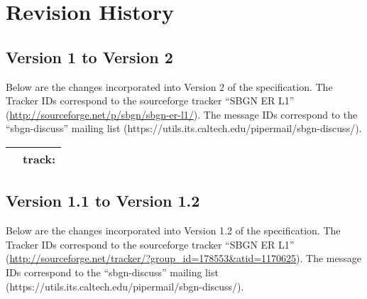 \chapter{Revision History}

\section{Version 1 to Version 2}

Below are the changes incorporated into Version 2 of the \SBGNERLone specification. The Tracker IDs correspond to the sourceforge tracker ``SBGN ER L1'' (\url{http://sourceforge.net/p/sbgn/sbgn-er-l1/}). The message IDs correspond to the ``sbgn-discuss'' mailing list (https://utils.its.caltech.edu/pipermail/sbgn-discuss/).

\begin{center}
\label{tab:revision history 1.2}
\tablelasttail{\hline}
\begin{supertabular}{|p{0.75\textwidth}|p{0.25\textwidth}|}\hline
 & track:  \\\hline
\end{supertabular}
\end{center}


\section{Version 1.1 to Version 1.2}

Below are the changes incorporated into Version 1.2 of the \SBGNERLone specification. The Tracker IDs correspond to the sourceforge tracker ``SBGN ER L1'' (\url{http://sourceforge.net/tracker/?group_id=178553&atid=1170625}). The message IDs correspond to the ``sbgn-discuss'' mailing list (https://utils.its.caltech.edu/pipermail/sbgn-discuss/).

